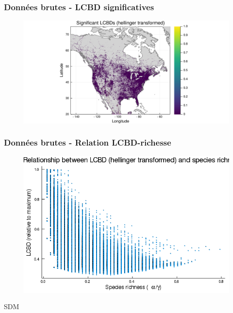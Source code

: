 \documentclass[10pt]{beamer}
\begin{document}
\begin{frame}
  \frametitle{Données brutes - LCBD significatives}
  \begin{figure}
    \centering
    \hspace*{-2cm}\includegraphics[scale=0.5]{fig/raw-lcbd-signif.pdf}
  \end{figure}
\end{frame}

\begin{frame}
  \frametitle{Données brutes - Relation LCBD-richesse}
  \begin{figure}
    \centering
    \includegraphics[scale=0.4]{fig/raw-relation-lcbd-richness-transf.png}
  \end{figure}
\end{frame}



\begin{frame}
  \vfill
  \centering
  \huge SDM
  \vfill
\end{frame}
\end{document}
